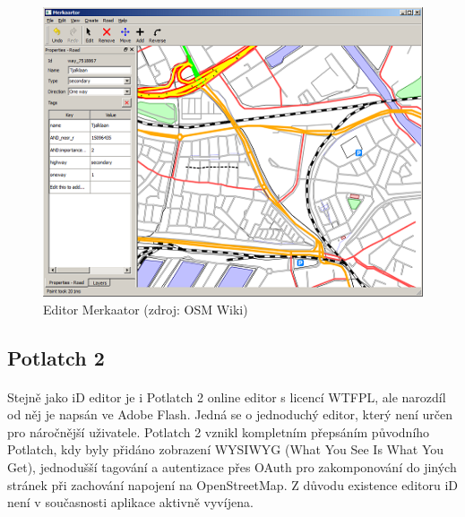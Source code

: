 \documentclass[11pt,a4paper,titlepage,oneside]{book}
\begin{document}
		\begin{figure}[!h]
			\begin{center}
				\includegraphics[width=12cm]{obrazky/merkaator_osm.png}
				\caption{Editor Merkaator (zdroj: OSM Wiki\cite{wiki_merkaator})}
			\end{center}
		\end{figure}

		\subsection{Potlatch 2}
			\paragraph{} Stejně jako iD editor je i Potlatch 2 online editor s licencí WTFPL, ale narozdíl od něj je napsán ve Adobe Flash. Jedná se o jednoduchý editor, který není určen pro náročnější uživatele. Potlatch 2 vznikl kompletním přepsáním původního Potlatch, kdy byly přidáno zobrazení WYSIWYG (What You See Is What You Get), jednodušší tagování a autentizace přes OAuth pro zakomponování do jiných stránek při zachování napojení na OpenStreetMap. Z důvodu existence editoru iD není v současnosti aplikace aktivně vyvíjena.

\end{document}
